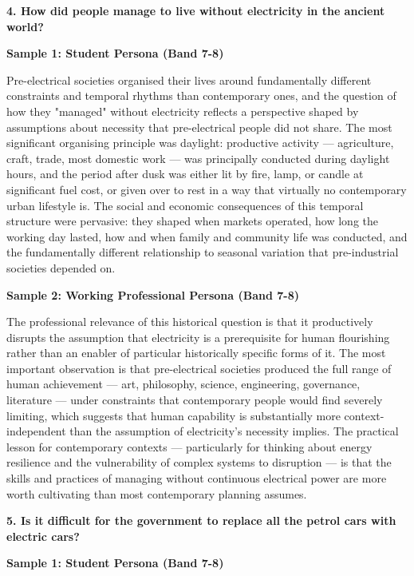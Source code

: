 \separator

\begin{ieltsquestion}
\textbf{4. How did people manage to live without electricity in the ancient world?}
\end{ieltsquestion}
\textbf{Sample 1: Student Persona (Band 7-8)}

Pre-electrical societies organised their lives around fundamentally different constraints and temporal rhythms than contemporary ones, and the question of how they "managed" without electricity reflects a perspective shaped by assumptions about necessity that pre-electrical people did not share. The most significant organising principle was daylight: productive activity — agriculture, craft, trade, most domestic work — was principally conducted during daylight hours, and the period after dusk was either lit by fire, lamp, or candle at significant fuel cost, or given over to rest in a way that virtually no contemporary urban lifestyle is. The social and economic consequences of this temporal structure were pervasive: they shaped when markets operated, how long the working day lasted, how and when family and community life was conducted, and the fundamentally different relationship to seasonal variation that pre-industrial societies depended on.

\textbf{Sample 2: Working Professional Persona (Band 7-8)}

The professional relevance of this historical question is that it productively disrupts the assumption that electricity is a prerequisite for human flourishing rather than an enabler of particular historically specific forms of it. The most important observation is that pre-electrical societies produced the full range of human achievement — art, philosophy, science, engineering, governance, literature — under constraints that contemporary people would find severely limiting, which suggests that human capability is substantially more context-independent than the assumption of electricity's necessity implies. The practical lesson for contemporary contexts — particularly for thinking about energy resilience and the vulnerability of complex systems to disruption — is that the skills and practices of managing without continuous electrical power are more worth cultivating than most contemporary planning assumes.

\separator

\begin{ieltsquestion}
\textbf{5. Is it difficult for the government to replace all the petrol cars with electric cars?}
\end{ieltsquestion}
\textbf{Sample 1: Student Persona (Band 7-8)}

